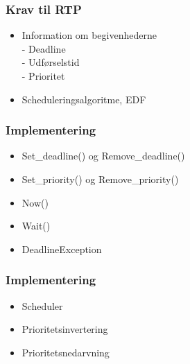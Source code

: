 \documentclass[12pt]{beamer}
\begin{document}
\begin{frame}
  \frametitle{Krav til RTP}
  \begin{itemize}   
	\item Information om begivenhederne\\
  - Deadline \\
  - Udførselstid\\
  - Prioritet
	\item Scheduleringsalgoritme, EDF
  \end{itemize}
\end{frame}

\begin{frame}
  \frametitle{Implementering}
  \begin{itemize}   
    \item Set\_deadline() og Remove\_deadline()
    \item Set\_priority() og Remove\_priority()
    \item Now()
    \item Wait()
	  \item DeadlineException
  \end{itemize}
\end{frame}

\begin{frame}
  \frametitle{Implementering}
  \begin{itemize}   
    \item Scheduler 
	\item Prioritetsinvertering
	\item Prioritetsnedarvning
  \end{itemize}
\end{frame}
\end{document}
